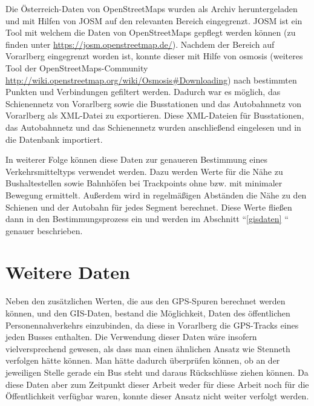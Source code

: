 Die Österreich-Daten von OpenStreetMaps wurden als Archiv heruntergeladen und mit Hilfen von JOSM auf den relevanten Bereich eingegrenzt. JOSM ist ein Tool mit welchem die Daten von OpenStreetMaps gepflegt werden können (zu finden unter \url{https://josm.openstreetmap.de/}). Nachdem der Bereich auf Vorarlberg eingegrenzt worden ist, konnte dieser mit Hilfe von osmosis (weiteres Tool der OpenStreetMaps-Community \url{http://wiki.openstreetmap.org/wiki/Osmosis#Downloading}) nach bestimmten Punkten und Verbindungen gefiltert werden. Dadurch war es möglich, das Schienennetz von Vorarlberg sowie die Busstationen und das Autobahnnetz von Vorarlberg als XML-Datei zu exportieren. Diese XML-Dateien für Busstationen, das Autobahnnetz und das Schienennetz wurden anschließend eingelesen und in die Datenbank importiert. 

In weiterer Folge können diese Daten zur genaueren Bestimmung eines Verkehrsmitteltyps verwendet werden. Dazu werden Werte für die Nähe zu Bushaltestellen sowie Bahnhöfen bei Trackpoints ohne bzw. mit minimaler Bewegung ermittelt. Außerdem wird in regelmäßigen Abständen die Nähe zu den Schienen und der Autobahn für jedes Segment berechnet. Diese Werte fließen dann in den Bestimmungsprozess ein und werden im Abschnitt ``\ref{gisdaten} `` genauer beschrieben.

\section{Weitere Daten}
Neben den zusätzlichen Werten, die aus den GPS-Spuren berechnet werden können, und den GIS-Daten, bestand die Möglichkeit, Daten des öffentlichen Personennahverkehrs einzubinden, da diese in Vorarlberg die GPS-Tracks eines jeden Busses enthalten. Die Verwendung dieser Daten wäre insofern vielversprechend gewesen, als dass man einen ähnlichen Ansatz wie Stenneth verfolgen hätte können. Man hätte dadurch überprüfen können, ob an der jeweiligen Stelle gerade ein Bus steht und daraus Rückschlüsse ziehen können. Da diese Daten aber zum Zeitpunkt dieser Arbeit weder für diese Arbeit noch für die Öffentlichkeit verfügbar waren, konnte dieser Ansatz nicht weiter verfolgt werden.

\clearpage
